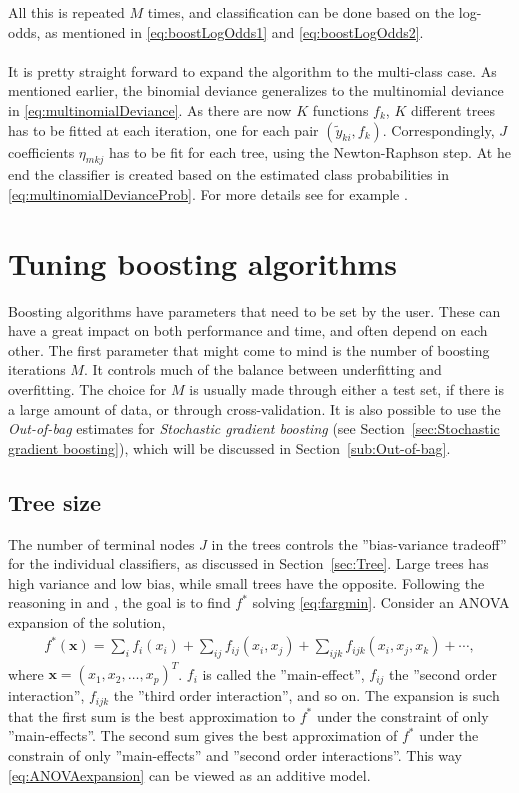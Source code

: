 All this is repeated $M$ times, and classification can be done based on the log-odds, as mentioned in \eqref{eq:boostLogOdds1} and \eqref{eq:boostLogOdds2}. \\
\\
It is pretty straight forward to expand the algorithm to the multi-class case. As mentioned earlier, the binomial deviance generalizes to the multinomial deviance in \eqref{eq:multinomialDeviance}. As there are now $K$ functions $f_k$, $K$ different trees has to be fitted at each iteration, one for each pair $(\tilde y_{k i}, f_k)$. Correspondingly, $J$ coefficients $\eta_{m k j}$ has to be fit for each tree, using the Newton-Raphson step. At he end the classifier is created based on the estimated class probabilities in \eqref{eq:multinomialDevianceProb}. For more details see for example \cite{friedman}.

\section{Tuning boosting algorithms}
\label{sec:Tuning boosting algorithms}
Boosting algorithms have parameters that need to be set by the user. These can have a great impact on both performance and time, and often depend on each other. The first parameter that might come to mind is the number of boosting iterations $M$. It controls much of the balance between underfitting and overfitting. The choice for $M$ is usually made through either a test set, if there is a large amount of data, or through cross-validation. It is also possible to use the \textit{Out-of-bag} estimates for  \textit{Stochastic gradient boosting} (see Section~\ref{sec:Stochastic gradient boosting}), which will be discussed in Section~\ref{sub:Out-of-bag}.

\subsection{Tree size}
\label{sub:Tree size}
The number of terminal nodes $J$ in the trees controls the ''bias-variance tradeoff'' for the individual classifiers, as discussed in Section~\ref{sec:Tree}.  Large trees has high variance and low bias, while small trees have the opposite.   Following the reasoning in \cite{modstat} and \cite{friedman}, the goal is to find $f^*$ solving \eqref{eq:fargmin}. Consider an ANOVA expansion of the solution,
\begin{align}
  \label{eq:ANOVAexpansion} 
  f^*(\mathbf{x}) = \sum_{i} f_i(x_i) + \sum_{ij} f_{ij}(x_i, x_j) + 
  \sum_{ijk} f_{ijk}(x_i, x_j, x_k) + \cdots,
\end{align}
where $\mathbf{x} = (x_1, x_2, \ldots, x_p)^T$. $f_i$ is called the ''main-effect'', $f_{ij}$ the ''second order interaction'', $f_{ijk}$ the ''third order interaction'', and so on. The expansion is such that the first sum is the best approximation to $f^*$ under the constraint of only ''main-effects''. The second sum gives the best approximation of $f^*$ under the constrain of only ''main-effects'' and ''second order interactions''. This way \eqref{eq:ANOVAexpansion} can be viewed as an additive model. 

